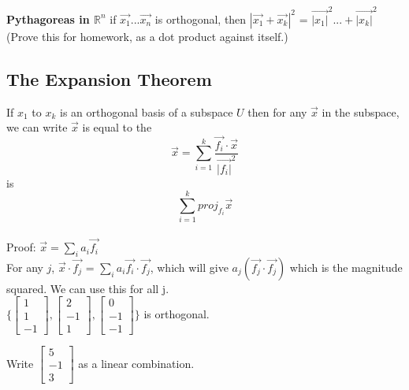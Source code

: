 \documentclass[10pt, twocolumn]{report}
\begin{document}
\textbf{Pythagoreas in $\mathbb{R}^n$} if {$\vec{x_1} ... \vec{x_n}$} is orthogonal, then $|\vec{x_1} + \vec{x_k}|^2$ = $\vec{|x_1|}^2 ... + \vec{|x_k|}^2$ \\(Prove this for homework, as a dot product against itself.)

\subsection{The Expansion Theorem}
If $x_1$ to $x_k$ is an orthogonal basis of a subspace $U$ then for any $\vec{x}$ in the subspace, we can write $\vec{x}$ is equal to the
$$ \vec{x} = \sum_{i = 1}^{k} \frac{\vec{f_i}\cdot \vec{x}}{\vec{|f_i|}^2}$$ is $$\sum_{i=1}^{k} proj_{f_i} \vec{x}$$ \\

Proof: $\vec{x} = \sum_i a_i\vec{f_i}$ \\ For any $j$, $\vec{x}\cdot\vec{f_j}$ = $\sum_i a_i\vec{f_i} \cdot \vec{f_j}$, which will give $a_j(\vec{f_j}\cdot\vec{f_j})$ which is the magnitude squared. We can use this for all j. \\

$\bigg\{\begin{bmatrix} 1 \\ 1 \\ -1 \end{bmatrix}, \begin{bmatrix} 2 \\ -1 \\ 1 \end{bmatrix}, \begin{bmatrix} 0 \\ -1 \\ -1 \end{bmatrix}\bigg\}$ is orthogonal.

Write $\begin{bmatrix} 5 \\ -1 \\ 3 \end{bmatrix}$ as a linear combination.
\end{document}

